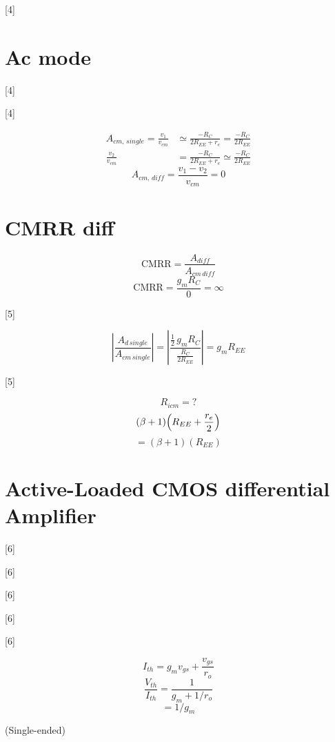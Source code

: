 \documentclass[11pt,a4paper]{article}
\begin{document}
[4]

\section{Ac mode}

[4]

[4]

\begin{align*}
A_{cm,\,single} = \frac{v_1}{v_{cm}} &\simeq \frac{-R_C}{2R_{EE}+r_e} = \frac{-R_C}{2R_{EE}} \\
\frac{v_2}{v_{cm}} &= \frac{-R_C}{2R_{EE}+r_e} \simeq \frac{-R_C}{2R_{EE}}
\end{align*}
\[ A_{cm,\,diff} = \frac{v_1 - v_2}{v_{cm}} = 0 \]

\section{CMRR diff}

\[ \mathrm{CMRR} = \frac{A_{diff}}{A_{cm\,diff}} \]
\[ \mathrm{CMRR} = \frac{g_m R_C}{0} = \infty \]

[5]

\[ \left|\frac{A_{d\,single}}{A_{cm\,single}}\right| = \left|\frac{\frac{1}{2}\,g_m R_C}{\frac{R_C}{2R_{EE}}}\right| = g_m R_{EE} \]

[5]

\[ R_{icm} = ? \]
\[ (\beta+1)\Bigl(R_{EE} + \frac{r_e}{2}\Bigr) \]
\[ = (\beta+1)(R_{EE}) \]

\section{Active-Loaded CMOS differential Amplifier}

[6]

[6]

[6]

[6]

[6]

\[ I_{th} = g_m v_{gs} + \frac{v_{gs}}{r_o} \]
\[ \frac{V_{th}}{I_{th}} = \frac{1}{g_m + 1/r_o} \]
\[ = 1/g_m \]

(Single-ended)
\end{document}
